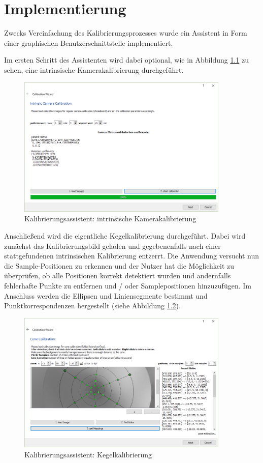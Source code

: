 \chapter{Implementierung}
\label{ch:implementation}

Zwecks Vereinfachung des Kalibrierungsprozesses wurde ein Assistent in Form einer graphischen Benutzerschnittstelle implementiert.

Im ersten Schritt des Assistenten wird dabei optional, wie in Abbildung \ref{fig:wizard1} zu sehen, eine intrinsische Kamerakalibrierung durchgeführt.
\begin{figure}[!htb]
	\centering
	\includegraphics[width=0.9\textwidth]{images/GUI/calibWizard1_1.PNG}
	\caption{Kalibrierungsassistent: intrinsische Kamerakalibrierung}
	\label{fig:wizard1}
\end{figure}

Anschließend wird die eigentliche Kegelkalibrierung durchgeführt. Dabei wird zunächst das Kalibrierungsbild geladen und gegebenenfalls nach einer stattgefundenen intrinsischen Kalibrierung entzerrt. Die Anwendung versucht nun die Sample-Positionen zu erkennen und der Nutzer hat die Möglichkeit zu überprüfen, ob alle Positionen korrekt detektiert wurden und andernfalls fehlerhafte Punkte zu entfernen und / oder Samplepositionen hinzuzufügen. Im Anschluss werden die Ellipsen und Liniensegmente bestimmt und Punktkorrespondenzen hergestellt (siehe Abbildung \ref{fig:wizard2}).

\begin{figure}[!htb]
	\centering
	\includegraphics[width=0.9\textwidth]{images/GUI/calibWizard2_1.PNG}
	\caption{Kalibrierungsassistent: Kegelkalibrierung}
	\label{fig:wizard2}
\end{figure}

